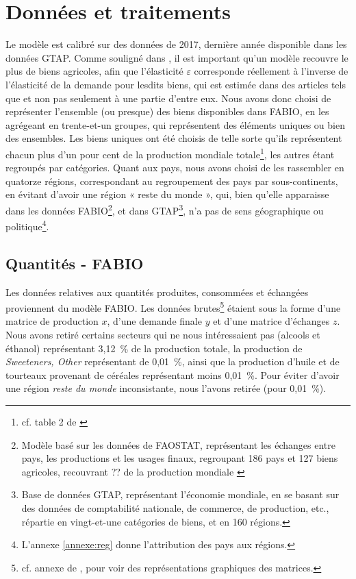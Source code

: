 \section{Données et traitements}
Le modèle est calibré sur des données de 2017, dernière année disponible dans les données GTAP. Comme souligné dans \cite{Gouel2021}, il est important qu'un modèle recouvre le plus de biens agricoles, afin que l'élasticité $\varepsilon$ corresponde réellement à l'inverse de l'élasticité de la demande pour lesdits biens, qui est estimée dans des articles tels que \cite{Comin2021} et non pas seulement à une partie d'entre eux. Nous avons donc choisi de représenter l'ensemble (ou presque) des biens disponibles dans FABIO, en les agrégeant en trente-et-un groupes, qui représentent des éléments uniques ou bien des ensembles. Les biens uniques ont été choisis de telle sorte qu'ils représentent chacun plus d'un pour cent de la production mondiale totale\footnote{cf. table 2 de \cite{Gouel2021}}, les autres étant regroupés par catégories. Quant aux pays, nous avons choisi de les rassembler en quatorze régions, correspondant au regroupement des pays par sous-continents, en évitant d'avoir une région « reste du monde », qui, bien qu'elle apparaisse dans les données FABIO\footnote{Modèle basé sur les données de FAOSTAT, représentant les échanges entre pays, les productions et les usages finaux, regroupant 186 pays et 127 biens agricoles, recouvrant ?? de la production mondiale \cite{Bruckner2019}}, et dans GTAP\footnote{Base de données GTAP, représentant l'économie mondiale, en se basant sur des données de comptabilité nationale, de commerce, de production, etc., répartie en vingt-et-une catégories de biens, et en 160 régions.}, n'a pas de sens géographique ou politique\footnote{L'annexe \ref{annexe:reg} donne l'attribution des pays aux régions.}.


\subsection{Quantités - FABIO}

Les données relatives aux quantités produites, consommées et échangées proviennent du modèle FABIO. Les données brutes\footnote{cf. annexe de \cite{Bruckner2019}, pour voir des représentations graphiques des matrices.} étaient sous la forme d'une matrice de production $x$, d'une demande finale $y$  et d'une matrice d'échanges $z$. Nous avons retiré certains secteurs qui ne nous intéressaient pas (alcools et éthanol) représentant 3,12~\% de la production totale, la production de \textit{Sweeteners, Other} représentant de 0,01~\%, ainsi que la production d'huile et de tourteaux provenant de céréales représentant moins 0,01~\%. Pour éviter d'avoir une région \textit{reste du monde} inconsistante, nous l'avons retirée (pour 0,01~\%).

